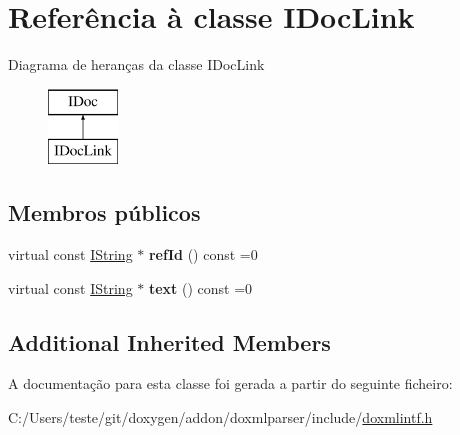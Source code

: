 \hypertarget{class_i_doc_link}{\section{Referência à classe I\-Doc\-Link}
\label{class_i_doc_link}
}
Diagrama de heranças da classe I\-Doc\-Link\begin{figure}[H]
\begin{center}
\leavevmode
\includegraphics[height=2.000000cm]{class_i_doc_link}
\end{center}
\end{figure}
\subsection*{Membros públicos}
\begin{DoxyCompactItemize}
\item 
\hypertarget{class_i_doc_link_a60f519e58362b0fc9165a31c906379e6}{virtual const \hyperlink{class_i_string}{I\-String} $\ast$ {\bfseries ref\-Id} () const =0}\label{class_i_doc_link_a60f519e58362b0fc9165a31c906379e6}

\item 
\hypertarget{class_i_doc_link_aa487ae4b2bd6e3e7975ff2efe2666148}{virtual const \hyperlink{class_i_string}{I\-String} $\ast$ {\bfseries text} () const =0}\label{class_i_doc_link_aa487ae4b2bd6e3e7975ff2efe2666148}

\end{DoxyCompactItemize}
\subsection*{Additional Inherited Members}


A documentação para esta classe foi gerada a partir do seguinte ficheiro\-:\begin{DoxyCompactItemize}
\item 
C\-:/\-Users/teste/git/doxygen/addon/doxmlparser/include/\hyperlink{include_2doxmlintf_8h}{doxmlintf.\-h}\end{DoxyCompactItemize}
